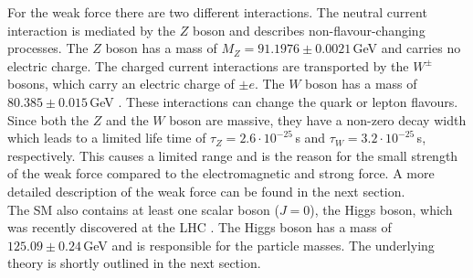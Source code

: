 \noindent For the weak force there are two different interactions. The neutral current interaction is mediated by the $Z$ boson and describes non-flavour-changing processes. The $Z$ boson has a mass of $M_Z=91.1976 \pm 0.0021$\,GeV \cite{SMmasses} and carries no electric charge. The charged current interactions are transported by the $W^\pm$ bosons, which carry an electric charge of $\pm e$. The $W$ boson has a mass of $80.385 \pm 0.015$\,GeV \cite{SMmasses}. These interactions can change the quark or lepton flavours. Since both the $Z$ and the $W$ boson are massive, they have a non-zero decay width which leads to a limited life time of $\tau_Z=2.6\cdot 10^{-25}$\,s and $\tau_W=3.2\cdot 10^{-25}$\,s, respectively. This causes a limited range and is the reason for the small strength of the weak force compared to the electromagnetic and strong force. A more detailed description of the weak force can be found in the next section.\\ 

\noindent The SM also contains at least one scalar boson ($J=0$), the Higgs boson, which was recently discovered at the LHC \cite{cms_higgsdiscov,atlas_higgsdiscov}. The Higgs boson has a mass of $125.09 \pm 0.24$\,GeV and is responsible for the particle masses. The underlying theory is shortly outlined in the next section.\\

